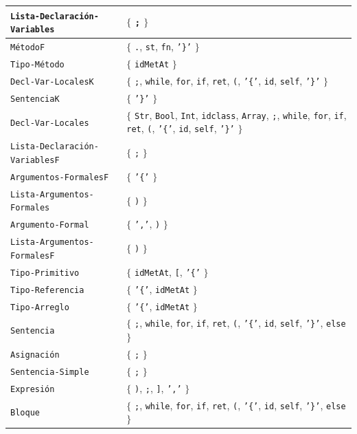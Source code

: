 \begin{longtable}{|
>{\raggedright\arraybackslash}p{}|
>{\raggedright\arraybackslash}p{}|}
\texttt{Lista-Declaración-Variables} & \(\{\) \texttt{;} \(\}\) \\ \hline
\texttt{MétodoF} & \(\{\) \texttt{.}, \texttt{st}, \texttt{fn}, \texttt{'\}'} \(\}\) \\ \hline
\texttt{Tipo-Método} & \(\{\) \texttt{idMetAt} \(\}\) \\ \hline
\texttt{Decl-Var-LocalesK} & \(\{\) \texttt{;}, \texttt{while}, \texttt{for}, \texttt{if}, \texttt{ret}, \texttt{(}, \texttt{'\{'}, \texttt{id}, \texttt{self}, \texttt{'\}'} \(\}\) \\ \hline
\texttt{SentenciaK} & \(\{\) \texttt{'\}'} \(\}\) \\ \hline
\texttt{Decl-Var-Locales} & \(\{\) \texttt{Str}, \texttt{Bool}, \texttt{Int}, \texttt{idclass}, \texttt{Array}, \texttt{;}, \texttt{while}, \texttt{for}, \texttt{if}, \texttt{ret}, \texttt{(}, \texttt{'\{'}, \texttt{id}, \texttt{self}, \texttt{'\}'} \(\}\) \\ \hline
\texttt{Lista-Declaración-VariablesF} & \(\{\) \texttt{;} \(\}\) \\ \hline
\texttt{Argumentos-FormalesF} & \(\{\) \texttt{'\{'} \(\}\) \\ \hline
\texttt{Lista-Argumentos-Formales} & \(\{\) \texttt{)} \(\}\) \\ \hline
\texttt{Argumento-Formal} & \(\{\) \texttt{','}, \texttt{)} \(\}\) \\ \hline
\texttt{Lista-Argumentos-FormalesF} & \(\{\) \texttt{)} \(\}\) \\ \hline
\texttt{Tipo-Primitivo} & \(\{\) \texttt{idMetAt}, \texttt{[}, \texttt{'\{'} \(\}\) \\ \hline
\texttt{Tipo-Referencia} & \(\{\) \texttt{'\{'}, \texttt{idMetAt} \(\}\) \\ \hline
\texttt{Tipo-Arreglo} & \(\{\) \texttt{'\{'}, \texttt{idMetAt} \(\}\) \\ \hline
\texttt{Sentencia} & \(\{\) \texttt{;}, \texttt{while}, \texttt{for}, \texttt{if}, \texttt{ret}, \texttt{(}, \texttt{'\{'}, \texttt{id}, \texttt{self}, \texttt{'\}'}, \texttt{else} \(\}\) \\ \hline
\texttt{Asignación} & \(\{\) \texttt{;} \(\}\) \\ \hline
\texttt{Sentencia-Simple} & \(\{\) \texttt{;} \(\}\) \\ \hline
\texttt{Expresión} & \(\{\) \texttt{)}, \texttt{;}, \texttt{]}, \texttt{','} \(\}\) \\ \hline
\texttt{Bloque} & \(\{\) \texttt{;}, \texttt{while}, \texttt{for}, \texttt{if}, \texttt{ret}, \texttt{(}, \texttt{'\{'}, \texttt{id}, \texttt{self}, \texttt{'\}'}, \texttt{else} \(\}\) \\ \hline

\end{longtable}
